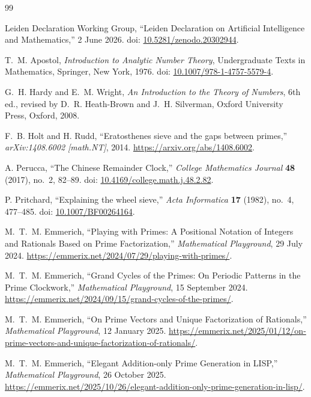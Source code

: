 \documentclass[11pt,a4paper]{article}
\theoremstyle{clockplain}
\theoremstyle{definition}
\theoremstyle{remark}
\begin{document}
\begin{thebibliography}{99}
\raggedright

Leiden Declaration Working Group,
``Leiden Declaration on Artificial Intelligence and Mathematics,''
2 June 2026.
\newblock doi: \href{https://doi.org/10.5281/zenodo.20302944}{10.5281/zenodo.20302944}.

T.~M. Apostol,
\emph{Introduction to Analytic Number Theory},
Undergraduate Texts in Mathematics, Springer, New York, 1976.
\newblock doi: \href{https://doi.org/10.1007/978-1-4757-5579-4}{10.1007/978-1-4757-5579-4}.

G.~H. Hardy and E.~M. Wright,
\emph{An Introduction to the Theory of Numbers},
6th ed., revised by D.~R. Heath-Brown and J.~H. Silverman,
Oxford University Press, Oxford, 2008.

F.~B. Holt and H. Rudd,
``Eratosthenes sieve and the gaps between primes,''
\emph{arXiv:1408.6002 [math.NT]}, 2014.
\newblock \url{https://arxiv.org/abs/1408.6002}.

A. Perucca,
``The Chinese Remainder Clock,''
\emph{College Mathematics Journal} \textbf{48} (2017), no.~2, 82--89.
\newblock doi: \href{https://doi.org/10.4169/college.math.j.48.2.82}{10.4169/college.math.j.48.2.82}.

P. Pritchard,
``Explaining the wheel sieve,''
\emph{Acta Informatica} \textbf{17} (1982), no.~4, 477--485.
\newblock doi: \href{https://doi.org/10.1007/BF00264164}{10.1007/BF00264164}.

M.~T.~M. Emmerich,
``Playing with Primes: A Positional Notation of Integers and Rationals Based on Prime Factorization,''
\emph{Mathematical Playground}, 29 July 2024.
\newblock \url{https://emmerix.net/2024/07/29/playing-with-primes/}.

M.~T.~M. Emmerich,
``Grand Cycles of the Primes: On Periodic Patterns in the Prime Clockwork,''
\emph{Mathematical Playground}, 15 September 2024.
\newblock \url{https://emmerix.net/2024/09/15/grand-cycles-of-the-primes/}.

M.~T.~M. Emmerich,
``On Prime Vectors and Unique Factorization of Rationals,''
\emph{Mathematical Playground}, 12 January 2025.
\newblock \url{https://emmerix.net/2025/01/12/on-prime-vectors-and-unique-factorization-of-rationals/}.

M.~T.~M. Emmerich,
``Elegant Addition-only Prime Generation in LISP,''
\emph{Mathematical Playground}, 26 October 2025.
\newblock \url{https://emmerix.net/2025/10/26/elegant-addition-only-prime-generation-in-lisp/}.


\end{thebibliography}
\end{document}
